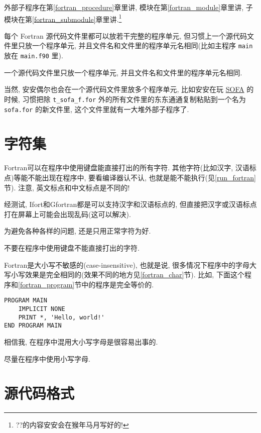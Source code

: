 外部子程序在第\ref{fortran_procedure}章里讲, 模块在第\ref{fortran_module}章里讲, 子模块在第\ref{fortran_submodule}章里讲.\footnote{??\mbox{}的内容安安会在猴年马月写好的!}

每个 Fortran 源代码文件里都可以放若干完整的程序单元, 但习惯上一个源代码文件里只放一个程序单元, 并且文件名和文件里的程序单元名相同(比如主程序 \texttt{main} 放在 \texttt{main.f90} 里).
\begin{convention}
    一个源代码文件里只放一个程序单元, 并且文件名和文件里的程序单元名相同.
\end{convention}
当然, 安安偶尔也会在一个源代码文件里放多个程序单元, 比如安安在玩 \href{https://iausofa.org/}{SOFA} 的时候, 习惯把除 \texttt{t\_{}sofa\_{}f.for} 外的所有文件里的东东通通复制粘贴到一个名为 \texttt{sofa.for} 的新文件里, 这个文件里就有一大堆外部子程序了.

\section{字符集}

Fortran可以在程序中使用键盘能直接打出的所有字符. 其他字符(比如汉字, 汉语标点)等能不能出现在程序中, 要看编译器认不认, 也就是能不能执行(见\ref{run_fortran}节). 注意, 英文标点和中文标点是不同的!

经测试, Ifort和Gfortran都是可以支持汉字和汉语标点的, 但直接把汉字或汉语标点打在屏幕上可能会出现乱码(这可以解决).

为避免各种各样的问题, 还是只用正常字符为好.

\begin{convention}
    不要在程序中使用键盘不能直接打出的字符.
\end{convention}

Fortran是大小写不敏感的(case-insensitive), 也就是说, 很多情况下程序中的字母大写小写效果是完全相同的(效果不同的地方见\ref{fortran_char}节). 比如, 下面这个程序和\ref{fortran_program}节中的程序是完全等价的.
\begin{lstlisting}
PROGRAM MAIN
    IMPLICIT NONE
    PRINT *, 'Hello, world!'
END PROGRAM MAIN
\end{lstlisting}

相信我, 在程序中混用大小写字母是很容易出事的.

\begin{convention}
    尽量在程序中使用小写字母.
\end{convention}

\section{源代码格式}

